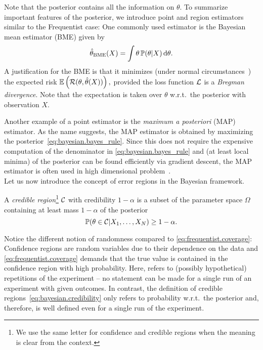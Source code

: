 Note that the posterior contains all the information on $\theta$.
To summarize important features of the posterior, we introduce point and region estimators similar to the Frequentist case:
One commonly used estimator is the Bayesian mean estimator (BME) given by
\[
  \hat\theta_\mathrm{BME}(X) = \int \theta \, \mathbb{P}(\theta | X) \, \mathrm{d}\theta.
\]
A justification for the BME is that it minimizes (under normal circumstances~\cite{Lehmann_1998_Theory,Banerjee_2005_On}) the expected risk
\(
  \mathbb{E} \left( \mathcal{R}(\theta, \hat\theta(X)) \right),
\)
provided the loss function $\mathcal{L}$ is a \emph{Bregman divergence}.
Note that the expectation is taken over $\theta$ w.r.t.\ the posterior with observation $X$.

Another example of a point estimator is the \emph{maximum a posteriori} (MAP) estimator.
As the name suggests, the MAP estimator is obtained by maximizing the posterior~\eqref{eq:bayesian.bayes_rule}.
Since this does not require the expensive computation of the denominator in \cref{eq:bayesian.bayes_rule} and (at least local minima) of the posterior can be found efficiently via gradient descent, the MAP estimator is often used in high dimensional problem~\cite{Murphy_2012_Machine}.\\


Let us now introduce the concept of error regions in the Bayesian framework.
\begin{definition}
  \label{def:bayesian.cr}
  A \emph{credible region}\footnote{%
    We use the same letter for confidence and credible regions when the meaning is clear from the context.
  }
  $\mathcal{C}$ with credibility $1-\alpha$ is a subset of the parameter space $\Omega$ containing at least mass $1-\alpha$ of the posterior
  \[
    \label{eq:bayesian.credibility}
    \mathbb{P}(\theta \in \mathcal{C} | X_1, \ldots, X_N) \ge 1-\alpha.
  \]
\end{definition}
Notice the different notion of randomness compared to \cref{eq:frequentist.coverage}:
Confidence regions are random variables due to their dependence on the data and \cref{eq:frequentist.coverage} demands that the true value is contained in the confidence region with high probability.
Here,  refers to (possibly hypothetical) repetitions of the experiment -- no statement can be made for a single run of an experiment with given outcomes.
In contrast, the definition of credible regions~\eqref{eq:bayesian.credibility} only refers to probability w.r.t.\ the posterior and, therefore, is well defined even for a single run of the experiment.

